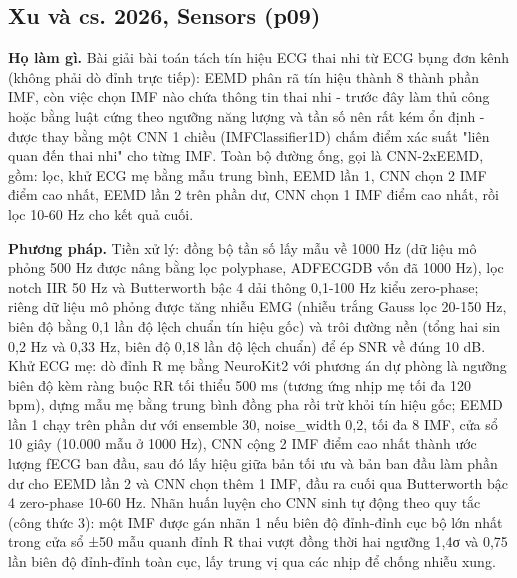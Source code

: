 \documentclass[12pt,a4paper]{article}
\begin{document}
\subsection{Xu và cs. 2026, Sensors \normalfont\small (p09)}
\par\vspace{2pt}
\par\vspace{4pt}
\noindent \textbf{Họ làm gì.} Bài giải bài toán tách tín hiệu ECG thai nhi từ ECG bụng đơn kênh (không phải dò đỉnh trực tiếp): EEMD phân rã tín hiệu thành 8 thành phần IMF, còn việc chọn IMF nào chứa thông tin thai nhi - trước đây làm thủ công hoặc bằng luật cứng theo ngưỡng năng lượng và tần số nên rất kém ổn định - được thay bằng một CNN 1 chiều (IMFClassifier1D) chấm điểm xác suất "liên quan đến thai nhi" cho từng IMF. Toàn bộ đường ống, gọi là CNN-2xEEMD, gồm: lọc, khử ECG mẹ bằng mẫu trung bình, EEMD lần 1, CNN chọn 2 IMF điểm cao nhất, EEMD lần 2 trên phần dư, CNN chọn 1 IMF điểm cao nhất, rồi lọc 10-60 Hz cho kết quả cuối.\par\vspace{3pt}
\noindent \textbf{Phương pháp.} Tiền xử lý: đồng bộ tần số lấy mẫu về 1000 Hz (dữ liệu mô phỏng 500 Hz được nâng bằng lọc polyphase, ADFECGDB vốn đã 1000 Hz), lọc notch IIR 50 Hz và Butterworth bậc 4 dải thông 0,1-100 Hz kiểu zero-phase; riêng dữ liệu mô phỏng được tăng nhiễu EMG (nhiễu trắng Gauss lọc 20-150 Hz, biên độ bằng 0,1 lần độ lệch chuẩn tín hiệu gốc) và trôi đường nền (tổng hai sin 0,2 Hz và 0,33 Hz, biên độ 0,18 lần độ lệch chuẩn) để ép SNR về đúng 10 dB. Khử ECG mẹ: dò đỉnh R mẹ bằng NeuroKit2 với phương án dự phòng là ngưỡng biên độ kèm ràng buộc RR tối thiểu 500 ms (tương ứng nhịp mẹ tối đa 120 bpm), dựng mẫu mẹ bằng trung bình đồng pha rồi trừ khỏi tín hiệu gốc; EEMD lần 1 chạy trên phần dư với ensemble 30, noise\_width 0,2, tối đa 8 IMF, cửa sổ 10 giây (10.000 mẫu ở 1000 Hz), CNN cộng 2 IMF điểm cao nhất thành ước lượng fECG ban đầu, sau đó lấy hiệu giữa bản tối ưu và bản ban đầu làm phần dư cho EEMD lần 2 và CNN chọn thêm 1 IMF, đầu ra cuối qua Butterworth bậc 4 zero-phase 10-60 Hz. Nhãn huấn luyện cho CNN sinh tự động theo quy tắc (công thức 3): một IMF được gán nhãn 1 nếu biên độ đỉnh-đỉnh cục bộ lớn nhất trong cửa sổ ±50 mẫu quanh đỉnh R thai vượt đồng thời hai ngưỡng 1,4σ và 0,75 lần biên độ đỉnh-đỉnh toàn cục, lấy trung vị qua các nhịp để chống nhiễu xung.\par\vspace{3pt}
\end{document}
